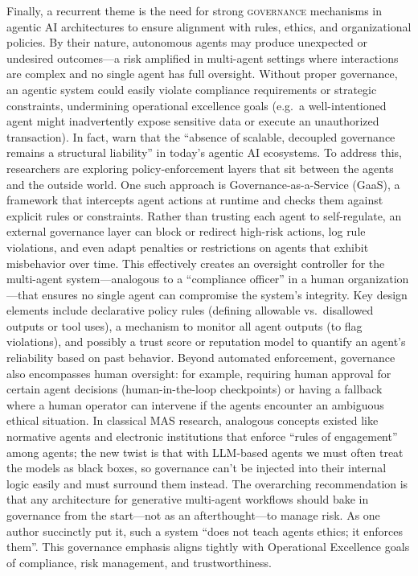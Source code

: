 Finally, a recurrent theme is the need for strong \textsc{governance} mechanisms in agentic AI architectures to ensure alignment with rules, ethics, and organizational policies. By their nature, autonomous agents may produce unexpected or undesired outcomes---a risk amplified in multi-agent settings where interactions are complex and no single agent has full oversight. Without proper governance, an agentic system could easily violate compliance requirements or strategic constraints, undermining operational excellence goals (e.g.~a well-intentioned agent might inadvertently expose sensitive data or execute an unauthorized transaction). In fact, \textcite{gauravGovernance2025} warn that the “absence of scalable, decoupled governance remains a structural liability” in today's agentic AI ecosystems. To address this, researchers are exploring policy-enforcement layers that sit between the agents and the outside world. One such approach is Governance-as-a-Service (GaaS), a framework that intercepts agent actions at runtime and checks them against explicit rules or constraints. Rather than trusting each agent to self-regulate, an external governance layer can block or redirect high-risk actions, log rule violations, and even adapt penalties or restrictions on agents that exhibit misbehavior over time. This effectively creates an oversight controller for the multi-agent system---analogous to a “compliance officer” in a human organization---that ensures no single agent can compromise the system's integrity. Key design elements include declarative policy rules (defining allowable vs.~disallowed outputs or tool uses), a mechanism to monitor all agent outputs (to flag violations), and possibly a trust score or reputation model to quantify an agent's reliability based on past behavior. Beyond automated enforcement, governance also encompasses human oversight: for example, requiring human approval for certain agent decisions (human-in-the-loop checkpoints) or having a fallback where a human operator can intervene if the agents encounter an ambiguous ethical situation. In classical MAS research, analogous concepts existed like normative agents and electronic institutions that enforce “rules of engagement” among agents; the new twist is that with LLM-based agents we must often treat the models as black boxes, so governance can't be injected into their internal logic easily and must surround them instead. The overarching recommendation is that any architecture for generative multi-agent workflows should bake in governance from the start---not as an afterthought---to manage risk. As one author succinctly put it, such a system “does not teach agents ethics; it enforces them”. This governance emphasis aligns tightly with Operational Excellence goals of compliance, risk management, and trustworthiness. 

